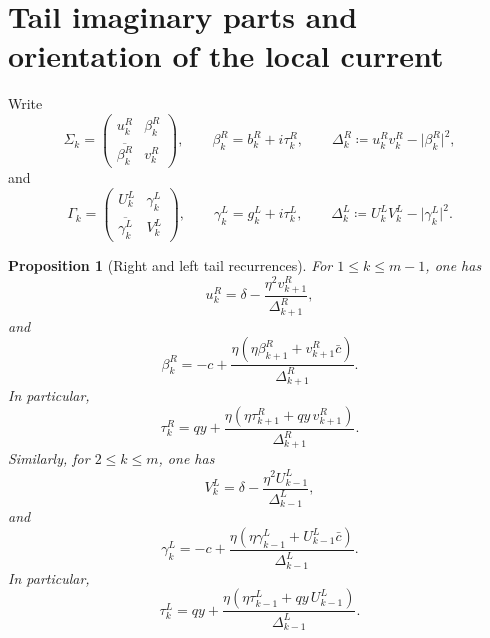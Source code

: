 \documentclass[11pt]{article}
\newtheorem{proposition}[theorem]{Proposition}
\begin{document}
\section{Tail imaginary parts and orientation of the local current}

Write
\[
\Sigma_k=
\begin{pmatrix}
u_k^R & \beta_k^R\\
\overline{\beta_k^R} & v_k^R
\end{pmatrix},
\qquad
\beta_k^R=b_k^R+i\tau_k^R,
\qquad
\Delta_k^R\coloneqq u_k^R v_k^R-\bigl|\beta_k^R\bigr|^2,
\]
and
\[
\Gamma_k=
\begin{pmatrix}
U_k^L & \gamma_k^L\\
\overline{\gamma_k^L} & V_k^L
\end{pmatrix},
\qquad
\gamma_k^L=g_k^L+i\tau_k^L,
\qquad
\Delta_k^L\coloneqq U_k^L V_k^L-\bigl|\gamma_k^L\bigr|^2.
\]

\begin{proposition}[Right and left tail recurrences]\label{prop:taurec}
For \(1\le k\le m-1\), one has
\[
u_k^R
=
\delta-\frac{\eta^2 v_{k+1}^R}{\Delta_{k+1}^R},
\]
and
\[
\beta_k^R
=
-c+\frac{\eta(\eta\beta_{k+1}^R+v_{k+1}^R\bar c)}{\Delta_{k+1}^R}.
\]
In particular,
\[
\tau_k^R
=
qy+\frac{\eta(\eta\tau_{k+1}^R+qy\,v_{k+1}^R)}{\Delta_{k+1}^R}.
\]
Similarly, for \(2\le k\le m\), one has
\[
V_k^L
=
\delta-\frac{\eta^2 U_{k-1}^L}{\Delta_{k-1}^L},
\]
and
\[
\gamma_k^L
=
-c+\frac{\eta(\eta\gamma_{k-1}^L+U_{k-1}^L\bar c)}{\Delta_{k-1}^L}.
\]
In particular,
\[
\tau_k^L
=
qy+\frac{\eta(\eta\tau_{k-1}^L+qy\,U_{k-1}^L)}{\Delta_{k-1}^L}.
\]
\end{proposition}
\end{document}

